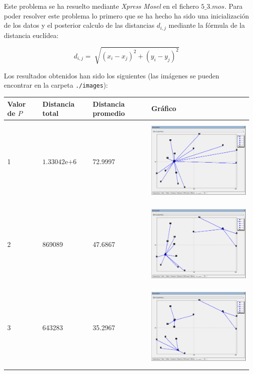 \documentclass[a4paper,11pt]{article}
\begin{document}
Este problema se ha resuelto mediante \textit{Xpress Mosel} en el fichero ${5\_3.mos}$. Para poder resolver este problema lo primero que se ha hecho ha sido una inicialización de los datos y el posterior calculo de las distancias ${d_{i,j}}$ mediante la fórmula de la distancia euclídea:

\begin{equation}
d_{i,j} = \sqrt[]{(x_i - x_j)^2 + (y_i - y_j)^2}
\end{equation}

Los resultados obtenidos han sido los siguientes (las imágenes se pueden encontrar en la carpeta \texttt{./images}):

\begin{table}[!htbp]
\label{5.3}
\centering
\begin{tabular}{|l|p{2cm}|p{2cm}|p{8cm}|}
\hline
Valor de ${P}$	& Distancia total	& Distancia promedio	& Gráfico	\\ \hline
1	& ${1.33042\mathrm{e}{+6}}$	& 72.9997	&	\includegraphics[width=8cm, height=4.25cm]{images/5_3_p1.png}	\\ \hline
2	& 869089	& 47.6867	& \includegraphics[width=8cm, height=4.25cm]{images/5_3_p2.png}	\\ \hline
3	& 643283	& 35.2967	& \includegraphics[width=8cm, height=4.25cm]{images/5_3_p3.png}	\\ \hline

\end{tabular}
\end{table}
\end{document}
